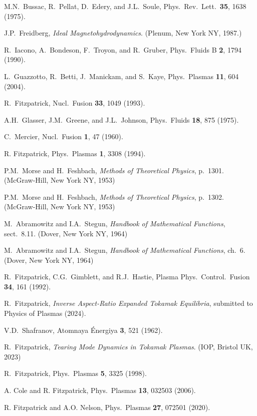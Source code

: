 \documentclass[12pt,prb,aps]{revtex4-1}
\begin{document}
\begin{thebibliography}{99}
 M.N.~Bussac, R.~Pellat, D.~Edery, and J.L.~Soule, Phys.\ Rev.\ Lett.\ {\bf 35}, 1638 (1975).

 J.P.~Freidberg, {\em Ideal Magnetohydrodynamics}. (Plenum, New York NY, 1987.)

 R.~Iacono, A.~Bondeson, F.~Troyon, and R.~Gruber, Phys.\ Fluids B {\bf 2}, 1794 (1990).

 L.~Guazzotto,  R.~Betti, J.~Manickam, and  S.~Kaye, Phys.\ Plasmas {\bf 11}, 604 (2004).

 R.~Fitzpatrick, Nucl.\ Fusion {\bf 33}, 1049 (1993).

 A.H.~Glasser, J.M.~Greene, and J.L.~Johnson, Phys.\ Fluids {\bf 18}, 875 (1975).

 C.~Mercier, Nucl.\ Fusion {\bf 1}, 47 (1960).

 R. Fitzpatrick, Phys.\ Plasmas {\bf 1}, 3308 (1994).

 P.M.~Morse and H.~Feshbach, {\em Methods of Theoretical Physics}, p.~1301. (McGraw-Hill, New York NY, 1953)

 P.M.~Morse and H.~Feshbach, {\em Methods of Theoretical Physics}, p.~1302. (McGraw-Hill, New York NY, 1953)

 M.~Abramowitz and I.A.~Stegun, {\em Handbook of Mathematical Functions}, sect.~8.11. (Dover, New York NY, 1964)

 M.~Abramowitz and I.A.~Stegun, {\em Handbook of Mathematical Functions}, ch.~6. (Dover, New York NY, 1964)

 R.~Fitzpatrick, C.G.~Gimblett, and R.J.~Hastie, Plasma Phys.\ Control.\ Fusion {\bf 34}, 161 (1992). 

 R.~Fitzpatrick, {\em Inverse Aspect-Ratio Expanded Tokamak Equilibria}, submitted to Physics of Plasmas (2024).

 V.D.~Shafranov, Atomnaya \'{E}nergiya {\bf 3}, 521  (1962).

 R.~Fitzpatrick, {\em Tearing Mode Dynamics in Tokamak Plasmas}. (IOP, Bristol UK,  2023)

 R.~Fitzpatrick, Phys.\ Plasmas {\bf 5}, 3325 (1998).

 A. Cole and R. Fitzpatrick, Phys.\ Plasmas {\bf 13}, 032503 (2006).

 R. Fitzpatrick and A.O. Nelson, Phys.\ Plasmas {\bf 27}, 072501 (2020).

\end{thebibliography}
\end{document}
